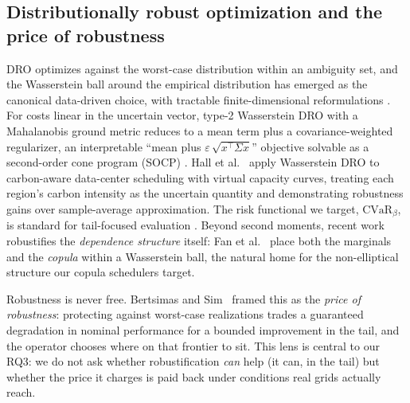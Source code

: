 \documentclass[12pt]{article}
\newcommand{\CVaR}{\mathrm{CVaR}}
\begin{document}
\subsection{Distributionally robust optimization and the price of robustness}
DRO optimizes against the worst-case distribution within an ambiguity set, and the
Wasserstein ball around the empirical distribution has emerged as the canonical
data-driven choice, with tractable finite-dimensional reformulations
\citep{esfahani2018,kuhn2019}. For costs linear in the uncertain vector, type-2
Wasserstein DRO with a Mahalanobis ground metric reduces to a mean term plus a
covariance-weighted regularizer, an interpretable ``mean plus
$\varepsilon\,\sqrt{x^\top\Sigma x}$'' objective solvable as a second-order cone
program (SOCP) \citep{blanchet2019}. Hall et al.~\citep{hall2024} apply Wasserstein DRO to
carbon-aware data-center scheduling with virtual capacity curves, treating each
region's carbon intensity as the uncertain quantity and demonstrating robustness
gains over sample-average approximation. The risk functional we target,
$\CVaR_{\beta}$, is standard for tail-focused evaluation \citep{rockafellar2000}.
Beyond second moments, recent work robustifies the \emph{dependence structure}
itself: Fan et al.~\citep{fan2024} place both the marginals and the \emph{copula} within a
Wasserstein ball, the natural home for the non-elliptical structure our copula
schedulers target.

Robustness is never free. Bertsimas and Sim~\citep{bertsimas2004} framed this as the
\emph{price of robustness}: protecting against worst-case realizations trades a
guaranteed degradation in nominal performance for a bounded improvement in the tail, and
the operator chooses where on that frontier to sit. This lens is central to our RQ3: we
do not ask whether robustification \emph{can} help (it can, in the tail) but whether the
price it charges is paid back under conditions real grids actually reach.
\end{document}
